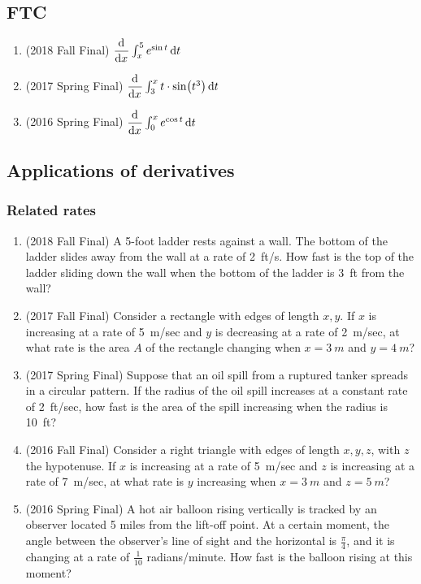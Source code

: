 \documentclass[10pt]{scrartcl}
\begin{document}
\subsection{FTC}
\begin{enumerate}
\item (2018 Fall Final) $\dod{}{x}\int_x^5 e^{\sin t} \dif t$
\item (2017 Spring Final) $\dod{}{x} \int_3^x t \cdot \sin(t^3) \dif t$
\item (2016 Spring Final) $\dod{}{x} \int_0^x e^{\cos t} \dif t$
\end{enumerate}

\subsection{Applications of derivatives}
\subsubsection{Related rates}
\begin{enumerate}
\item (2018 Fall Final) A 5-foot ladder rests against a wall. The bottom of the ladder slides away from the wall at a rate of \SI{2}{ft/s}. How fast is the top of the ladder sliding down the wall when the bottom of the ladder is \SI{3}{ft} from the wall?
\item (2017 Fall Final) Consider a rectangle with edges of length $x, y$. If $x$ is increasing at a rate of \SI{5}{m/sec} and $y$ is decreasing at a rate of \SI{2}{m/sec}, at what rate is the area $A$ of the rectangle changing when $x = \SI{3}{m}$ and $y = \SI{4}{m}$?
\item (2017 Spring Final) Suppose that an oil spill from a ruptured tanker spreads in a circular pattern. If the radius of the oil spill increases at a constant rate of \SI{2}{ft/sec}, how fast is the area of the spill increasing when the radius is \SI{10}{ft}?
\item (2016 Fall Final) Consider a right triangle with edges of length $x, y, z$, with $z$ the hypotenuse. If $x$ is increasing at a rate of \SI{5}{m/sec} and $z$ is increasing at a rate of \SI{7}{m/sec}, at what rate is $y$ increasing when $x = \SI{3}{m}$ and $z = \SI{5}{m}$?
\item (2016 Spring Final) A hot air balloon rising vertically is tracked by an observer located 5 miles from the lift-off point. At a certain moment, the angle between the observer's line of sight and the horizontal is $\frac \pi 4$, and it is changing at a rate of $\frac{1}{10}$ radians/minute. How fast is the balloon rising at this moment?
\end{enumerate}
\end{document}
